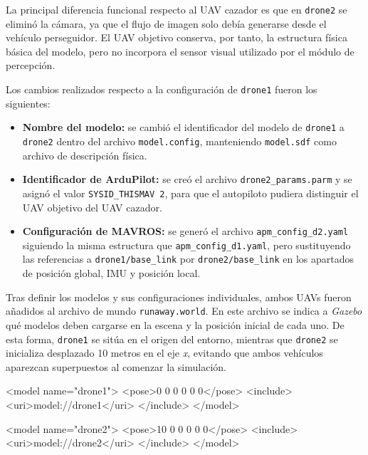 \vspace{0.3cm}

La principal diferencia funcional respecto al UAV cazador es que en \texttt{drone2} se eliminó la cámara, ya que el flujo de imagen solo debía generarse desde el vehículo perseguidor. El UAV objetivo conserva, por tanto, la estructura física básica del modelo, pero no incorpora el sensor visual utilizado por el módulo de percepción.

\vspace{0.3cm}

Los cambios realizados respecto a la configuración de \texttt{drone1} fueron los siguientes:

\begin{itemize}
    \item \textbf{Nombre del modelo:} se cambió el identificador del modelo de \texttt{drone1} a \texttt{drone2} dentro del archivo \texttt{model.config}, manteniendo \texttt{model.sdf} como archivo de descripción física.
    \item \textbf{Identificador de ArduPilot:} se creó el archivo \texttt{drone2\_params.parm} y se asignó el valor \texttt{SYSID\_THISMAV 2}, para que el autopiloto pudiera distinguir el UAV objetivo del UAV cazador.
    \item \textbf{Configuración de MAVROS:} se generó el archivo \texttt{apm\_config\_d2.yaml} siguiendo la misma estructura que \texttt{apm\_config\_d1.yaml}, pero sustituyendo las referencias a \texttt{drone1/base\_link} por \texttt{drone2/base\_link} en los apartados de posición global, IMU y posición local.
\end{itemize}

\vspace{0.3cm}

Tras definir los modelos y sus configuraciones individuales, ambos UAVs fueron añadidos al archivo de mundo \texttt{runaway.world}. En este archivo se indica a \textit{Gazebo} qué modelos deben cargarse en la escena y la posición inicial de cada uno. De esta forma, \texttt{drone1} se sitúa en el origen del entorno, mientras que \texttt{drone2} se inicializa desplazado 10 metros en el eje \textit{x}, evitando que ambos vehículos aparezcan superpuestos al comenzar la simulación.

\begin{listing}[language=XML,caption={Inclusión de \texttt{drone1} y \texttt{drone2} en \texttt{runaway.world}},label={lst:runaway-world-drones}]
<model name="drone1">
  <pose>0 0 0 0 0 0</pose>
  <include>
    <uri>model://drone1</uri>
  </include>
</model>

<model name="drone2">
  <pose>10 0 0 0 0 0</pose>
  <include>
    <uri>model://drone2</uri>
  </include>
</model>
\end{listing}

